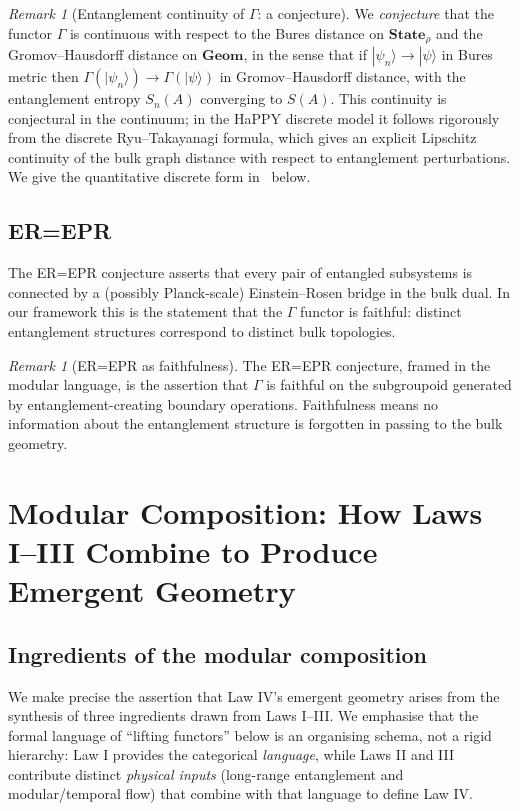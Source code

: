 \documentclass[12pt]{article}
\theoremstyle{definition}
\theoremstyle{remark}
\newtheorem{remark}[theorem]{Remark}
\begin{document}
\begin{remark}[Entanglement continuity of $\Gamma$: a conjecture]
\label{rem:gamma-cont}
We \emph{conjecture} that the functor $\Gamma$ is continuous with respect to the Bures distance on $\mathbf{State}_\rho$ and the Gromov--Hausdorff distance on $\mathbf{Geom}$, in the sense that if $|\psi_n\rangle \to |\psi\rangle$ in Bures metric then $\Gamma(|\psi_n\rangle) \to \Gamma(|\psi\rangle)$ in Gromov--Hausdorff distance, with the entanglement entropy $S_n(A)$ converging to $S(A)$. This continuity is conjectural in the continuum; in the HaPPY discrete model it follows rigorously from the discrete Ryu--Takayanagi formula, which gives an explicit Lipschitz continuity of the bulk graph distance with respect to entanglement perturbations. We give the quantitative discrete form in~ below.
\end{remark}

\subsection{ER=EPR}

The ER=EPR conjecture \cite{maldacena2013} asserts that every pair of entangled subsystems is connected by a (possibly Planck-scale) Einstein--Rosen bridge in the bulk dual. In our framework this is the statement that the $\Gamma$ functor is faithful: distinct entanglement structures correspond to distinct bulk topologies.

\begin{remark}[ER=EPR as faithfulness]
The ER=EPR conjecture, framed in the modular language, is the assertion that $\Gamma$ is faithful on the subgroupoid generated by entanglement-creating boundary operations. Faithfulness means no information about the entanglement structure is forgotten in passing to the bulk geometry.
\end{remark}

\section{Modular Composition: How Laws I--III Combine to Produce Emergent Geometry}
\label{sec:composition}

\subsection{Ingredients of the modular composition}

We make precise the assertion that Law IV's emergent geometry arises from the synthesis of three ingredients drawn from Laws I--III\@. We emphasise that the formal language of ``lifting functors'' below is an organising schema, not a rigid hierarchy: Law I provides the categorical \emph{language}, while Laws II and III contribute distinct \emph{physical inputs} (long-range entanglement and modular/temporal flow) that combine with that language to define Law IV\@.
\end{document}
